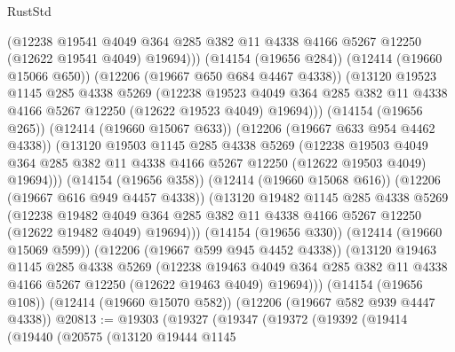 \begin{lexlean}{RustStd}
\begin{coremodule}
                (@12238
                  @19541
                  @4049
                  @364
                  @285
                  @382
                  @11
                  @4338
                  @4166
                  @5267
                  @12250
                  (@12622 @19541 @4049)
                  @19694)))
            (@14154 (@19656 @284))
            (@12414 (@19660 @15066 @650))
            (@12206 (@19667 @650 @684 @4467 @4338))
            (@13120
              @19523
              @1145
              @285
              @4338
              @5269
              (@12238
                @19523
                @4049
                @364
                @285
                @382
                @11
                @4338
                @4166
                @5267
                @12250
                (@12622 @19523 @4049)
                @19694)))
          (@14154 (@19656 @265))
          (@12414 (@19660 @15067 @633))
          (@12206 (@19667 @633 @954 @4462 @4338))
          (@13120
            @19503
            @1145
            @285
            @4338
            @5269
            (@12238
              @19503
              @4049
              @364
              @285
              @382
              @11
              @4338
              @4166
              @5267
              @12250
              (@12622 @19503 @4049)
              @19694)))
        (@14154 (@19656 @358))
        (@12414 (@19660 @15068 @616))
        (@12206 (@19667 @616 @949 @4457 @4338))
        (@13120
          @19482
          @1145
          @285
          @4338
          @5269
          (@12238
            @19482
            @4049
            @364
            @285
            @382
            @11
            @4338
            @4166
            @5267
            @12250
            (@12622 @19482 @4049)
            @19694)))
      (@14154 (@19656 @330))
      (@12414 (@19660 @15069 @599))
      (@12206 (@19667 @599 @945 @4452 @4338))
      (@13120
        @19463
        @1145
        @285
        @4338
        @5269
        (@12238
          @19463
          @4049
          @364
          @285
          @382
          @11
          @4338
          @4166
          @5267
          @12250
          (@12622 @19463 @4049)
          @19694)))
    (@14154 (@19656 @108))
    (@12414 (@19660 @15070 @582))
    (@12206 (@19667 @582 @939 @4447 @4338))
@20813 := @19303
    (@19327
      (@19347
        (@19372
          (@19392
            (@19414
              (@19440
                (@20575
                  (@13120
                    @19444
                    @1145

\end{coremodule}
\end{lexlean}
